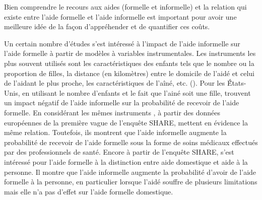 \begin{Article}
\begin{refsection}[Bonnal]
Bien comprendre le recours aux aides (formelle et informelle) et la relation qui existe entre l’aide formelle et l’aide informelle est important pour avoir une meilleure idée de la façon d’appréhender et de quantifier ces coûts.

Un certain nombre d’études s'est intéressé à l’impact de l’aide informelle sur l’aide formelle à partir de modèles à variables instrumentales. Les instruments les plus souvent utilisés sont les caractéristiques des enfants tels que le nombre ou la proportion de filles, la distance (en kilomètres) entre le domicile de l'aidé et celui de l'aidant le plus proche, les caractéristiques de l’aîné, etc. (\parencite{VANHOUTVEN2004,BOLIN2008,BONSANG2009}). Pour les \'États-Unis, en utilisant le nombre d’enfants et le fait que l’ainé soit une fille, \textcite{VANHOUTVEN2004} trouvent un impact négatif de l’aide informelle sur la probabilité de recevoir de l'aide formelle. En considérant les mêmes instruments \textcite{BOLIN2008}, à partir des données européennes de la première vague de l’enquête SHARE, mettent en évidence la même relation. Toutefois, ils montrent que l’aide informelle augmente la probabilité de recevoir de l’aide formelle sous la forme de soins médicaux effectués par des professionnels de santé. Encore à partir de l’enquête SHARE, \textcite{BONSANG2009} s’est intéressé pour l'aide formelle à la distinction entre aide domestique et aide à la personne. Il montre que l’aide informelle augmente la probabilité d’avoir de l’aide formelle à la personne, en particulier lorsque l’aidé souffre de plusieurs limitations mais elle n'a pas d'effet sur l'aide formelle domestique.


\end{refsection}
\end{Article}
